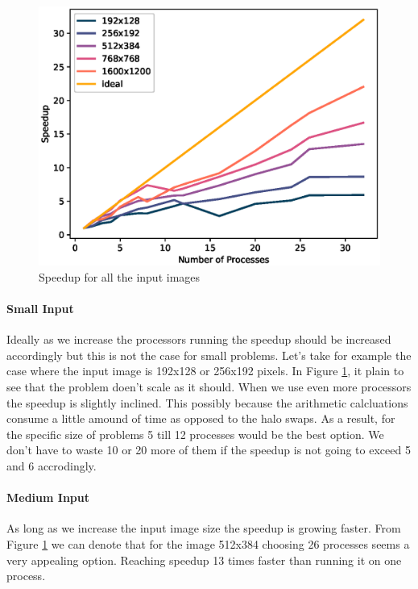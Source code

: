 \documentclass[12pt,a4paper]{article}
\begin{document}
          \begin{figure}[ht]
            \centering
            \includegraphics[scale=0.8]{../graphs/speedup.eps}
            \caption{Speedup for all the input images}
            \label{speedup}
          \end{figure}

          \paragraph{Small Input}
            Ideally as we increase the processors running the speedup should be increased accordingly but this is not the case for small problems. Let's take for example the case where the input image is 192x128 or 256x192 pixels. In Figure \ref{speedup}, it plain to see that the problem doen't scale as it should. When we use even more processors the speedup is slightly inclined. This possibly because the arithmetic calcluations consume a little amound of time as opposed to the halo swaps. As a result, for the specific size of problems 5 till 12 processes would be the best option. We don't have to waste 10 or 20 more of them if the speedup is not going to exceed 5 and 6 accrodingly.

          \paragraph{Medium Input}
            As long as we increase the input image size the speedup is growing faster. From Figure \ref{speedup} we can denote that for the image 512x384 choosing 26 processes seems a very appealing option. Reaching speedup 13 times faster than running it on one process.
\end{document}
